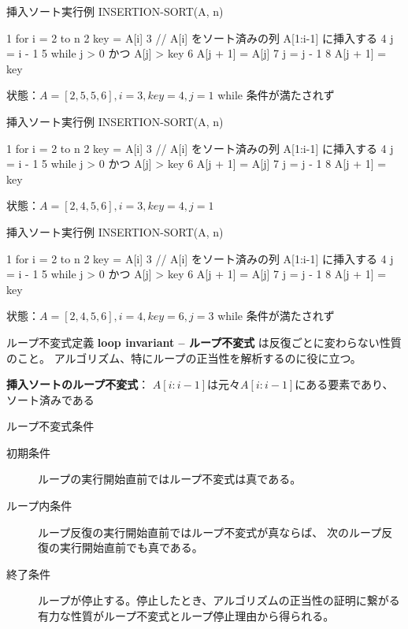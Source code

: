 \documentclass[unicode,11pt,aspectratio=169,notes]{beamer} %
\begin{document}
\begin{frame}[fragile]{挿入ソート}{実行例}
  INSERTION-SORT(A, n)
  \begin{semiverbatim}
1  for i = 2 to n
2    key = A[i]
3    // A[i] をソート済みの列 A[1:i-1] に挿入する
4    j = i - 1
5    \alert{while j > 0 かつ A[j] > key}
6      A[j + 1] = A[j]
7      j = j - 1
8    A[j + 1] = key
  \end{semiverbatim}
  状態：$A = [2, 5, 5, 6], i = 3, key = 4, j = 1$ while 条件が満たされず
\end{frame}

\begin{frame}[fragile]{挿入ソート}{実行例}
  INSERTION-SORT(A, n)
  \begin{semiverbatim}
1  for i = 2 to n
2    key = A[i]
3    // A[i] をソート済みの列 A[1:i-1] に挿入する
4    j = i - 1
5    while j > 0 かつ A[j] > key
6      A[j + 1] = A[j]
7      j = j - 1
8    \alert{A[j + 1] = key}
  \end{semiverbatim}
  状態：$A = [2, 4, 5, 6], i = 3, key = 4, j = 1$
\end{frame}

\begin{frame}[fragile]{挿入ソート}{実行例}
  INSERTION-SORT(A, n)
  \begin{semiverbatim}
1  for i = 2 to n
2    key = A[i]
3    // A[i] をソート済みの列 A[1:i-1] に挿入する
4    j = i - 1
5    \alert{while j > 0 かつ A[j] > key}
6      A[j + 1] = A[j]
7      j = j - 1
8    A[j + 1] = key
  \end{semiverbatim}
  状態：$A = [2, 4, 5, 6], i = 4, key = 6, j = 3$ while 条件が満たされず
\end{frame}

\begin{frame}{ループ不変式}{定義}
  \textbf{loop invariant -- ループ不変式} は反復ごとに変わらない性質のこと。
  アルゴリズム、特にループの正当性を解析するのに役に立つ。

  \vspace{5mm}

  \textbf{挿入ソートのループ不変式}：
  $A[i:i-1]$は元々$A[i:i-1]$にある要素であり、ソート済みである
\end{frame}

\begin{frame}{ループ不変式}{条件}
  \begin{description}
    \item[初期条件] ループの実行開始直前ではループ不変式は真である。
    \item[ループ内条件] ループ反復の実行開始直前ではループ不変式が真ならば、
    次のループ反復の実行開始直前でも真である。
    \item[終了条件] ループが停止する。停止したとき、アルゴリズムの正当性の証明に繋がる
    有力な性質がループ不変式とループ停止理由から得られる。
  \end{description}
\end{frame}
\end{document}
